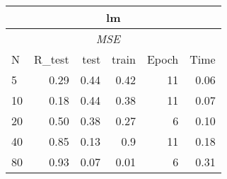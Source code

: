 \documentclass[a4paper, 10pt]{article}
\begin{document}
\begin{table}[h!]
\begin{tabular}{@{}lrrrrr@{}}
      \bottomrule
    \end{tabular} 
    \hfill
    \begin{tabular}{@{}lrrrrr@{}}
      \multicolumn{6}{c}{\textbf{lm}} \\
      \toprule
      &  & \multicolumn{2}{c}{\emph{MSE}} & & \\
      N  &   R_{test}  &  test & train  &  Epoch  & Time \\
      \midrule
       5  & 0.29    & 0.44   &  0.42    & 11       & 0.06  \\ 
      10  & 0.18    & 0.44   &  0.38    & 11       & 0.07  \\ 
      20  & 0.50    & 0.38   &  0.27    &  6       & 0.10  \\ 
      40  & 0.85    & 0.13   &  0.9     & 11       & 0.18  \\ 
      80  & 0.93    & 0.07   &  0.01    &  6       & 0.31  \\
      \bottomrule
    \end{tabular} 
    \mbox{}
  \end{table}
\end{document}
